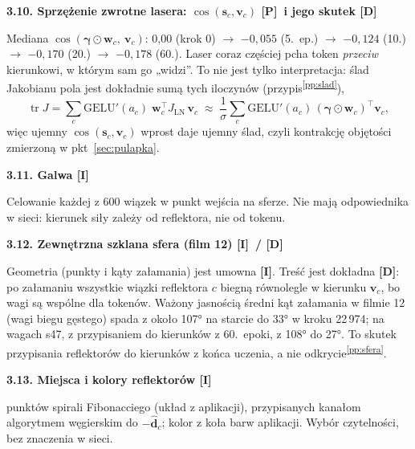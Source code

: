\documentclass[a4paper,11pt]{article}
\newcommand{\stD}{\textcolor{dok}{\textsf{\textbf{[D]}}}}
\newcommand{\stP}{\textcolor{pom}{\textsf{\textbf{[P]}}}}
\newcommand{\stI}{\textcolor{ilu}{\textsf{\textbf{[I]}}}}
\newcommand{\LN}{\mathrm{LN}}
\newcommand{\GELU}{\mathrm{GELU}}
\newcommand{\tr}{\operatorname{tr}}
\newcommand{\pp}[1]{\textsuperscript{\ref{pp:#1}}}
\newcommand{\elem}[1]{\par\medskip\noindent\textbf{#1}\par\nopagebreak}
\begin{document}
\elem{3.10. Sprzężenie zwrotne lasera: $\cos(\bm s_c,\bm v_c)$ \stP\ i jego skutek \stD}
Mediana $\cos(\bm\gamma\odot\bm w_c,\ \bm v_c)$: 0,00 (krok 0) $\to$ $-0{,}055$ (5.~ep.) $\to$ $-0{,}124$ (10.) $\to$ $-0{,}170$ (20.)
$\to$ $-0{,}178$ (60.). Laser coraz częściej pcha token \emph{przeciw} kierunkowi, w którym sam go „widzi”. To nie jest tylko
interpretacja: ślad Jakobianu pola jest dokładnie sumą tych iloczynów (przypis\pp{slad}),
\begin{equation}
\tr J = \sum_{c}\GELU'(a_c)\;\bm w_c^{\!\top}J_{\LN}\,\bm v_c
\;\approx\;\frac{1}{\sigma}\sum_c \GELU'(a_c)\,(\bm\gamma\odot\bm w_c)^{\!\top}\bm v_c ,
\end{equation}
więc ujemny $\cos(\bm s_c,\bm v_c)$ wprost daje ujemny ślad, czyli kontrakcję objętości zmierzoną w pkt~\ref{sec:pulapka}.

\elem{3.11. Galwa \stI}
Celowanie każdej z 600 wiązek w punkt wejścia na sferze. Nie mają odpowiednika w sieci: kierunek siły zależy od reflektora, nie od tokenu.

\elem{3.12. Zewnętrzna szklana sfera (film 12) \stI\ / \stD}
Geometria (punkty i kąty załamania) jest umowna \stI. Treść jest dokładna \stD: po załamaniu wszystkie wiązki reflektora $c$
biegną równolegle w kierunku $\bm v_c$, bo wagi są wspólne dla tokenów. Ważony jasnością średni kąt załamania w filmie 12 (wagi biegu
gęstego) spada z około 107° na starcie do 33° w kroku 22\,974; na wagach s47, z przypisaniem do kierunków z 60.~epoki, z 108° do 27°.
To skutek przypisania reflektorów do kierunków z końca uczenia, a nie odkrycie\pp{sfera}.

\elem{3.13. Miejsca i kolory reflektorów \stI}
768 punktów spirali Fibonacciego (układ z aplikacji), przypisanych kanałom algorytmem węgierskim do $-\hat{\bm d}_c$; kolor z koła barw
aplikacji. Wybór czytelności, bez znaczenia w sieci.
\end{document}
